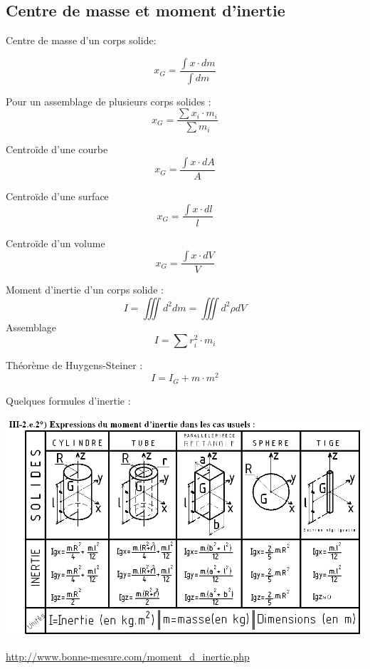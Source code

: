 \subsection{Centre de masse et moment d'inertie}
Centre de masse d'un corps solide:

\begin{equation}
x_G=\frac{\int x \cdot dm}{\int dm}
\end{equation}

Pour un assemblage de plusieurs corps solides :
\begin{equation}
x_G=\frac{\sum x_i \cdot m_i}{\sum m_i}
\end{equation}

Centroïde d'une courbe
\begin{equation}
x_G=\frac{\int x \cdot dA}{A}
\end{equation}

Centroïde d'une surface 
\begin{equation}
x_G=\frac{\int x \cdot dl}{l}
\end{equation}

Centroïde d'un volume
\begin{equation}
x_G=\frac{\int x \cdot dV}{V}
\end{equation}

Moment d'inertie d'un corps solide : 
\begin{equation}
I=\iiint d^2 dm=\iiint d^2 \rho dV
\end{equation}
Assemblage 
\begin{equation}
I=\sum r_i^2 \cdot m_i
\end{equation}

Théorème de Huygens-Steiner : 
\begin{equation}
I=I_G+m\cdot m^2
\end{equation}

Quelques formules d'inertie : \\
\begin{center}
	\includegraphics[scale=0.65]{MomentDinerties.png}
\end{center}
\url{http://www.bonne-mesure.com/moment_d_inertie.php}\\

